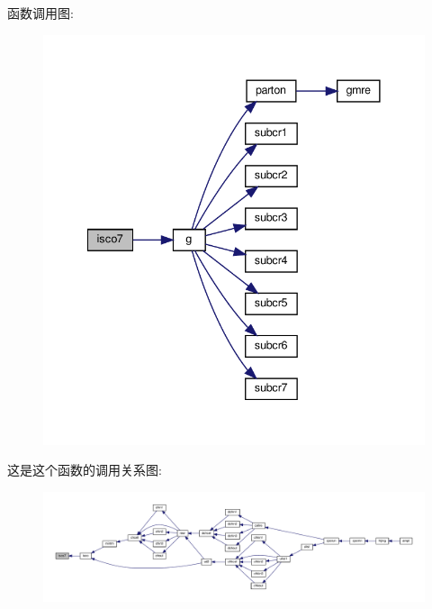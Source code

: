 函数调用图\+:
\nopagebreak
\begin{figure}[H]
\begin{center}
\leavevmode
\includegraphics[width=341pt]{isco7_8f90_a59d430ea54e1fadc81597a8b8b37d87a_cgraph}
\end{center}
\end{figure}
这是这个函数的调用关系图\+:
\nopagebreak
\begin{figure}[H]
\begin{center}
\leavevmode
\includegraphics[width=350pt]{isco7_8f90_a59d430ea54e1fadc81597a8b8b37d87a_icgraph}
\end{center}
\end{figure}
